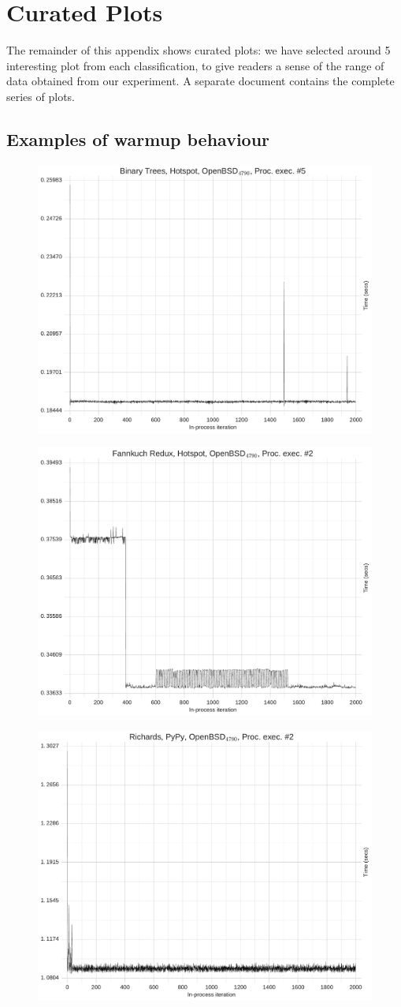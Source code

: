 \documentclass[preprint,numbers,10pt]{sigplanconf}
\begin{document}
\clearpage
\onecolumn

\section{Curated Plots}

\noindent The remainder of this appendix shows curated plots: we have selected
around 5 interesting plot from each classification, to give readers a sense of
the range of data obtained from our experiment. A separate document contains the
complete series of plots.

\clearpage
\twocolumn

\subsection{Examples of warmup behaviour}
\begin{figure}[h]
\centering
\includegraphics[width=.45\textwidth]{category_examples/warmup/warmup0.pdf}
\end{figure}
\begin{figure}[h]
\centering
\includegraphics[width=.45\textwidth]{category_examples/warmup/warmup1.pdf}
\end{figure}
\begin{figure}[h]
\centering
\includegraphics[width=.45\textwidth]{category_examples/warmup/warmup2.pdf}
\end{figure}
\end{document}
